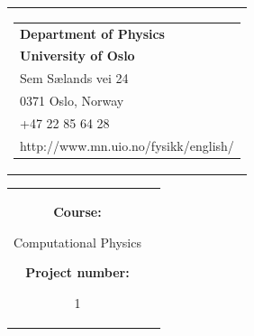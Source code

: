 


% 
{}
\thispagestyle{empty}
\begin{nopagebreak}
{\samepage 
\begin{tabular}{r}
\parbox{\textwidth}{  
\hfill \parbox{8cm}{\begin{tabular}{l} %
{\small \textbf{Department of Physics}}\\
{\small  \textbf{University of Oslo}} \\
{\small  Sem Sælands vei 24} \\
{\small  0371 Oslo, Norway} \\
{\small +47 22 85 64 28} \\
{\small http://www.mn.uio.no/fysikk/english/}
\end{tabular}}}

\end{tabular}

\begin{tabular}{cc}
\parbox{8cm}{
\begin{description}
\item { \textbf{Course:}}

	Computational Physics\\
	\hspace{4cm}
\item { \textbf{Project number:}}

	1 \\
	\hspace{4cm}


\end{description}}
\end{tabular}}
\end{nopagebreak}

